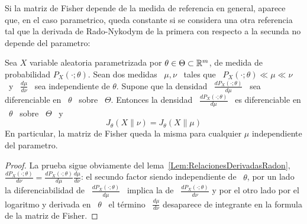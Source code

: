 {Si la matriz de Fisher depende de la medida de referencia en general, aparece que, en el caso parametrico, queda constante si se considera una otra referencia tal que la derivada de Rado-Nykodym de la primera con respecto a la secunda no depende del parametro:
%
\begin{lema}
  Sea        $X$        variable       aleatoria        parametrizada        por
  $\theta  \in \Theta  \subset \mathbb{R}^m$,  de medida  de probabilidad  $P_X(\cdot
  ; \theta)$.  Sean  dos  medidas  \  $\mu,   \nu$  \  tales  que  \  $P_X(\cdot
  ; \theta) \ll  \mu \ll \nu$ \  y \ $\frac{d\mu}{d\nu}$ \  sea independiente de
  $\theta$. Supone que  la densidad \ $\frac{dP_X(\cdot ;  \theta)}{d\mu}$ \ sea
  diferenciable en \ $\theta$ \ sobre \ $\Theta$. Entonces  la densidad \ $\frac{dP_X(\cdot ;  \theta)}{d\mu}$ \ es
  diferenciable en \ $\theta$ \ sobre \ $\Theta$ \ y
  \[
  J_\theta( X \| \nu) = J_\theta( X \| \mu )
  \]
  En particular, la matriz de Fisher queda la misma para cualquier $\mu$ independiente del parametro.
\end{lema}
%
\begin{proof}
La   prueba   sigue  obviamente   del   lema~\ref{Lem:RelacionesDerivadasRadon},
$\frac{dP_X(\cdot        ;        \theta)}{d\nu}       =        \frac{dP_X(\cdot
; \theta)}{d\mu} \frac{d\mu}{d\nu}$: el secundo factor siendo independiente de \
$\theta$,   por   un   lado   la  diferenciabilidad   de   \   $\frac{dP_X(\cdot
; \theta)}{d\mu}$ \ implica la de \ $\frac{dP_X(\cdot ; \theta)}{d\nu}$ y por el
otro  lado  por  el  logaritmo  y  derivada en  \  $\theta$  \  el  t\'ermino  \
$\frac{d\mu}{d\nu}$  desaparece de  integrante en  la  formula de  la matriz  de
Fisher.
\end{proof}
%
}


